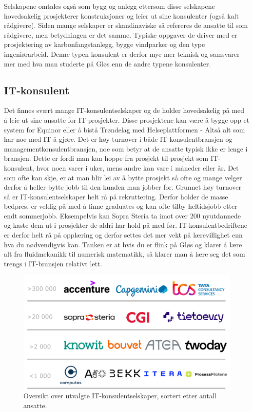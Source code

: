 Selskapene omtales også som bygg og anlegg ettersom disse selskapene hovedsakelig prosjekterer konstruksjoner og leier ut sine konsulenter (også kalt rådgivere). Siden mange selskaper er skandinaviske så refereres de ansatte til som rådgivere, men betydningen er det samme. Typiske oppgaver de driver med er prosjektering av karbonfangstanlegg, bygge vindparker og den type ingeniørarbeid. Denne typen konsulent er derfor mye mer teknisk og samsvarer mer med hva man studerte på Gløs enn de andre typene konsulenter. 



\subsection{IT-konsulent}

Det finnes svært mange IT-konsulentselskaper og de holder hovedsakelig på med å leie ut sine ansatte for IT-prosjekter. Disse prosjektene kan være å bygge opp et system for Equinor eller å bistå Trøndelag med Helseplattformen - Altså alt som har noe med IT å gjøre. Det er høy turnover i både IT-konsulentbransjen og managementkonsulentbransjen, noe som betyr at de ansatte typisk ikke er lenge i bransjen. Dette er fordi man kan hoppe fra prosjekt til prosjekt som IT-konsulent, hvor noen varer i uker, mens andre kan vare i måneder eller år. Det som ofte kan skje, er at man blir lei av å bytte prosjekt så ofte og mange velger derfor å heller bytte jobb til den kunden man jobber for. Grunnet høy turnover så er IT-konsulentselskaper helt rå på rekruttering. Derfor holder de masse bedpres, er veldig på med å finne graduates og kan ofte tilby heltidsjobb etter endt sommerjobb. Eksempelvis kan Sopra Steria ta imot over 200 nyutdannede og kaste dem ut i prosjekter de aldri har hold på med før. IT-konsulentbedriftene er derfor helt rå på opplæring og derfor settes det mer vekt på lærevillighet enn hva du nødvendigvis kan. Tanken er at hvis du er flink på Gløs og klarer å lære alt fra fluidmekanikk til numerisk matematikk, så klarer man å lære seg det som trengs i IT-bransjen relativt lett.

\begin{figure}[H]
    \centering
    \includegraphics[width=1\linewidth]{images/IT-konsulent.pdf}
    \caption{Oversikt over utvalgte IT-konsulentselskaper, sortert etter antall ansatte.}
    \label{fig:enter-label}
\end{figure}

